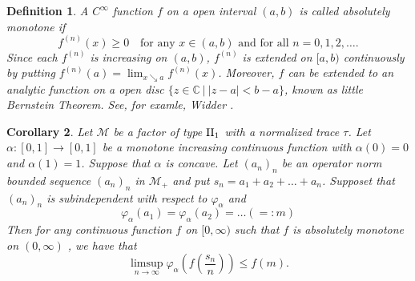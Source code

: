 \documentclass[a4paper,12pt]{amsart}
\newtheorem{definition}{Definition}[section]
\newtheorem{corollary}[definition]{Corollary}
\newcommand{\M}{\mathcal{M}}
\begin{document}
\begin{definition} \rm
A $C^{\infty}$ function $f$ on a open interval $(a,b)$ is called {\it absolutely monotone} if 
$$
 f^{(n)}(x) \geq 0   \ \ \ \text{ for  any } x \in (a,b) \text{ and for all }  n = 0,1,2,\dots .  
$$ 
Since each  $f^{(n)}$ is increasing on $(a,b)$,  $f^{(n)}$ is extended on $[a,b)$ continuously  by 
putting $f^{(n)} (a) = \lim_{ x \searrow a}  f^{(n)} (x)$. Moreover,  $f$ can be extended to an analytic function  on 
a open disc $\{z \in {\mathbb C} \ |  \ |z -a| < b-a \}$, known as little Bernstein Theorem. 
See, for examle, Widder \cite{widder}.  
\end{definition}

\begin{corollary}
Let $\M$ be a factor of type ${\rm II}_1$ with a normalized trace $\tau$.  
Let $\alpha: [0,1]  \rightarrow [0, 1]$ be a monotone increasing continuous function with $\alpha(0) = 0$ 
and $\alpha(1) = 1$.  
Suppose that $\alpha$ is concave.  
Let $(a_n)_n$ be an operator norm bounded sequence $(a_n)_n$ in ${\M}_{+}$ and 
put $s_n = a_1 + a_2 + \dots +a_n$.
Supposet that $(a_n)_n$ is subindependent with respect to $\varphi_{\alpha}$ and 
$$
\varphi_{\alpha}(a_1) = \varphi_{\alpha}(a_2) = \dots   (=:m)
$$
Then for any continuous function $f$ on $[0,\infty)$ such that $f$ is absolutely monotone  on $(0,\infty)$ , we have that 
$$
\limsup _{n \rightarrow \infty}  \varphi_{\alpha}(f(\frac{s_n}{n})) \leq f(m). 
$$
\end{corollary}
\end{document}

